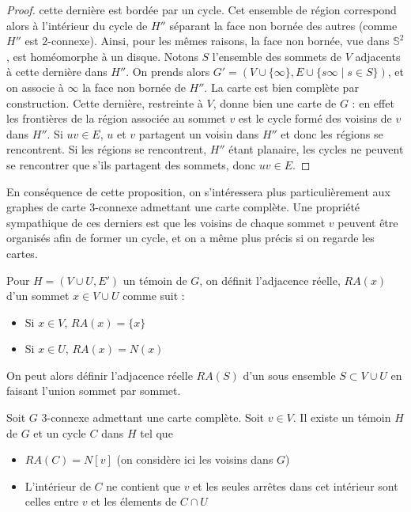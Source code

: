 \documentclass{scrartcl}
\begin{document}
\begin{flushleft}
\begin{proof}
    cette dernière est bordée par un cycle. Cet ensemble de région correspond alors à l'intérieur du cycle de $H''$
    séparant la face non bornée des autres (comme $H''$ est $2$-connexe). Ainsi, pour les mêmes raisons, la face non bornée, vue dans $\mathbb{S}^2$,
    est homéomorphe à un disque. Notons $S$ l'ensemble des sommets de $V$ adjacents à cette dernière dans $H''$.
    On prends alors $G' = (V \cup \{\infty\}, E \cup \{s\infty \mid s \in S \} )$, et on associe à $\infty$ la face non bornée de $H''$.
    La carte est bien complète par construction. Cette dernière, restreinte à $V$, donne bien une carte de $G$ : en effet les frontières
    de la région associée au sommet $v$ est le cycle formé des voisins de $v$ dans $H''$. Si $uv \in E$, $u$ et $v$ partagent un voisin
    dans $H''$ et donc les régions se rencontrent. Si les régions se rencontrent, $H''$ étant planaire, les cycles ne peuvent se rencontrer
    que s'ils partagent des sommets, donc $uv \in E$.

\end{proof}

En conséquence de cette proposition, on s'intéressera plus particulièrement aux graphes de carte $3$-connexe admettant une carte complète.
Une propriété sympathique de ces derniers est que les voisins de chaque sommet $v$ peuvent être organisés afin
de former un cycle, et on a même plus précis si on regarde les cartes.

\begin{def*}
    Pour $H = (V \cup U, E')$ un témoin de $G$, on définit l'adjacence réelle, $RA(x)$ d'un sommet $x \in V \cup U$ comme suit :
    \begin{itemize}
        \item Si $x \in V$, $RA(x) = \{x\}$
        \item Si $x \in U$, $RA(x) = N(x)$
    \end{itemize}
    On peut alors définir l'adjacence réelle $RA(S)$ d'un sous ensemble $S \subset V \cup U$ en faisant l'union sommet par sommet.
\end{def*}

\begin{prop}\label{cyclSep}
    Soit $G$ $3$-connexe admettant une carte complète. Soit $v \in V$. Il existe un témoin $H$ de $G$ et
    un cycle $C$ dans $H$ tel que
    \begin{itemize}
        \item $RA(C) = N[v]$ (on considère ici les voisins dans $G$)
        \item L'intérieur de $C$ ne contient que $v$ et les seules arrêtes dans cet intérieur sont celles entre $v$ et
        les élements de $C \cap U$
    \end{itemize}
\end{prop}


\end{flushleft}
\end{document}

